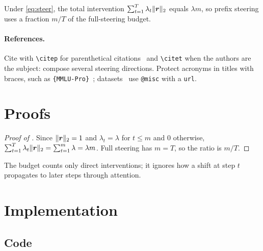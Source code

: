 \documentclass[11pt]{article}
\begin{document}
\begin{prop}\label{prop:budget}
Under \cref{eq:steer}, the total intervention $\sum_{t=1}^{T} \lambda_t \|\boldsymbol{r}\|_2$ equals $\lambda m$, so prefix steering uses a fraction $m/T$ of the full-steering budget.
\end{prop}

\paragraph{References.} Cite with \texttt{\textbackslash citep} for parenthetical citations~\citep{chowdhery2023palm, achiam2023gpt} and \texttt{\textbackslash citet} when the authors are the subject: \citet{scalena2024multiproperty} compose several steering directions. Protect acronyms in titles with braces, such as \texttt{\{MMLU-Pro\}}~\citep{wang2024mmlu}; datasets~\citep{politeguard} use \texttt{@misc} with a \texttt{url}.





\arxivappendix

\section{Proofs}\label{app:proofs}

\begin{proof}[Proof of ]
Since $\|\boldsymbol{r}\|_2 = 1$ and $\lambda_t = \lambda$ for $t \le m$ and $0$ otherwise, $\sum_{t=1}^{T} \lambda_t \|\boldsymbol{r}\|_2 = \sum_{t=1}^{m} \lambda = \lambda m$. Full steering has $m = T$, so the ratio is $m/T$.
\end{proof}

\begin{remark}
The budget counts only direct interventions; it ignores how a shift at step $t$ propagates to later steps through attention.
\end{remark}

\section{Implementation}\label{app:implementation}

\subsection{Code}
\end{document}
